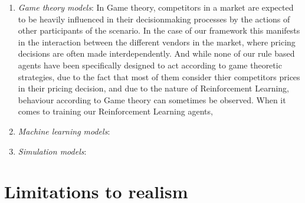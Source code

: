 \begin{enumerate}
	\item \emph{Game theory models}: In Game theory, competitors in a market are expected to be heavily influenced in their decisionmaking processes by the actions of other participants of the scenario.  In the case of our framework this manifests in the interaction between the different vendors in the market, where pricing decisions are often made interdependently. And while none of our rule based agents have been specifically designed to act according to game theoretic strategies, due to the fact that most of them consider thier competitors prices in their pricing decision, and due to the nature of Reinforcement Learning, behaviour according to Game theory can sometimes be observed.  When it comes to training our Reinforcement Learning agents, 

	\item \emph{Machine learning models}:

	\item \emph{Simulation models}:
\end{enumerate}


\section{Limitations to realism}